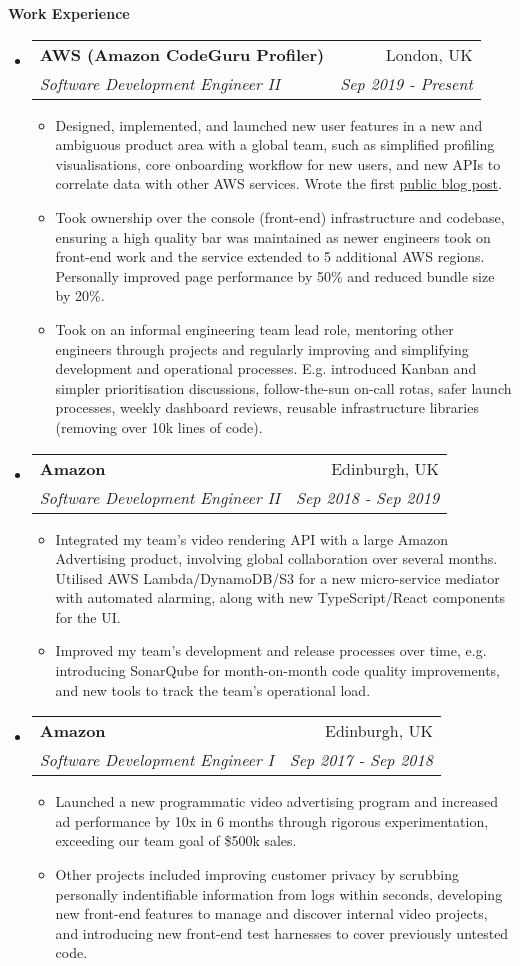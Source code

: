 \documentclass[letterpaper,11pt]{article}
\makeatletter
\newcommand{\resitem}[1]{\item #1 \vspace{-2pt}}
\newcommand{\resheading}[1]{{\large \colorbox{mygrey}{\begin{minipage}{\textwidth}{\textbf{#1 \vphantom{p\^{E}}}}\end{minipage}}}}
\newcommand{\ressubheading}[4]{
\begin{tabular*}{7.0in}{l@{\extracolsep{\fill}}r}
	\textbf{#1} & #2 \\
	\textit{#3} & \textit{#4} \\
\end{tabular*}\vspace{-6pt}}
\makeatother
\begin{document}
	\resheading{Work Experience}
	\begin{itemize}
		\item
		\ressubheading{AWS (Amazon CodeGuru Profiler)}{London, UK}{Software Development Engineer II}{Sep 2019 - Present}
		\begin{itemize}
			\resitem{Designed, implemented, and launched new user features in a new and ambiguous product area with a global team, such as simplified profiling visualisations, core onboarding workflow for new users, and new APIs to correlate data with other AWS services. Wrote the first \href{https://aws.amazon.com/blogs/machine-learning/optimizing-application-performance-with-amazon-codeguru-profiler/}{public blog post}.}
			\resitem{Took ownership over the console (front-end) infrastructure and codebase, ensuring a high quality bar was maintained as newer engineers took on front-end work and the service extended to 5 additional AWS regions. Personally improved page performance by 50\% and reduced bundle size by 20\%.}
			\resitem{Took on an informal engineering team lead role, mentoring other engineers through projects and regularly improving and simplifying development and operational processes. E.g. introduced Kanban and simpler prioritisation discussions, follow-the-sun on-call rotas, safer launch processes, weekly dashboard reviews, reusable infrastructure libraries (removing over 10k lines of code).}
		\end{itemize}

		\item
		\ressubheading{Amazon}{Edinburgh, UK}{Software Development Engineer II}{Sep 2018 - Sep 2019}
		\begin{itemize}
			\resitem{Integrated my team's video rendering API with a large Amazon Advertising product, involving global collaboration over several months. Utilised AWS Lambda/DynamoDB/S3 for a new micro-service mediator with automated alarming, along with new TypeScript/React components for the UI.}
			\resitem{Improved my team's development and release processes over time, e.g. introducing SonarQube for month-on-month code quality improvements, and new tools to track the team's operational load.}
		\end{itemize}

		\item
		\ressubheading{Amazon}{Edinburgh, UK}{Software Development Engineer I}{Sep 2017 - Sep 2018}
		\begin{itemize}
			\resitem{Launched a new programmatic video advertising program and increased ad performance by 10x in 6 months through rigorous experimentation, exceeding our team goal of \$500k sales.}
			\resitem{Other projects included improving customer privacy by scrubbing personally indentifiable information from logs within seconds, developing new front-end features to manage and discover internal video projects, and introducing new front-end test harnesses to cover previously untested code.}
		\end{itemize}


\end{itemize}
\end{document}
